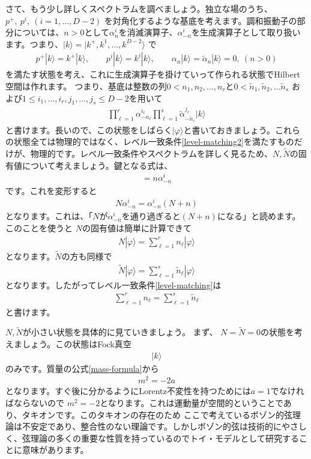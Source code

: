 \documentclass[report,paper=a4, fontsize=12pt, line_length=16cm, number_of_lines=33,dvipdfmx]{jlreq}
\numberwithin{equation}{chapter}
\numberwithin{equation}{section}
\newcommand{\alphat}{\tilde{\alpha}}
\newcommand{\Nt}{\widetilde{N}}
\begin{document}
さて、もう少し詳しくスペクトラムを調べましょう。独立な場のうち、$p^{+},\ p^{i},\ (i=1,\dots, D-2)$
を対角化するような基底を考えます。調和振動子の部分については、$n>0$として$\alpha_n^i$を消滅演算子、$\alpha_{-n}^i$を生成演算子として取り扱います。つまり、$|k\rangle=|k^+,k^1,\dots,k^{D-2}\rangle$ で
\begin{align}
p^{+}|k\rangle=k^{+}|k\rangle,\qquad
p^{i}|k\rangle=k^{i}|k\rangle,\qquad
\alpha_n|k\rangle=\alphat_n|k\rangle=0,\ (n>0)
\end{align}
を満たす状態を考え、これに生成演算子を掛けていって作られる状態でHilbert空間は作れます。
つまり、基底は整数の列$0<n_1,n_2, \dots, n_{r}$と$0<\tilde n_1, \tilde n_2, \dots \tilde n_{s}$
および$1 \le i_1,\dots,i_r,j_1,\dots,j_s\le D-2$を用いて
\begin{align}
\prod_{\ell=1}^{r}\alpha_{-n_{\ell}}^{i_{\ell}} \prod_{\ell=1}^{s}\alphat_{-\tilde n_{\ell}}^{j_{\ell}}|k\rangle
\end{align}
と書けます。長いので、この状態をしばらく$|\varphi\rangle$と書いておきましょう。これらの状態全ては物理的ではなく、レベル一致条件\eqref{level-matching2}を満たすものだけが、物理的です。レベル一致条件やスペクトラムを詳しく見るため、$N,\Nt$の固有値について考えましょう。鍵となる式は、
\begin{align}
[N,\alpha^i_{-n}]=n\alpha^i_{-n}
\end{align}
です。これを変形すると
\begin{align}
N\alpha^i_{-n}=\alpha^i_{-n}(N+n)
\end{align}
となります。これは、「$N$が$\alpha^i_{-n}$を通り過ぎると$(N+n)$になる」と読めます。このことを使うと
$N$の固有値は簡単に計算できて
\begin{align}
N|\varphi\rangle=\sum_{\ell=1}^{r}n_{\ell}|\varphi\rangle
\end{align}
となります。$\Nt$の方も同様で
\begin{align}
\Nt|\varphi\rangle=\sum_{\ell=1}^{s}\tilde n_{\ell}|\varphi\rangle
\end{align}
となります。したがってレベル一致条件\eqref{level-matching}は
\begin{align}
\sum_{\ell=1}^{r}n_{\ell}=\sum_{\ell=1}^{s}\tilde n_{\ell}
\end{align}
と書けます。

$N,\Nt$が小さい状態を具体的に見ていきましょう。
まず、 $N=\Nt=0$の状態を考えましょう。この状態はFock真空
\begin{align}
 |k\rangle
\end{align}
のみです。質量の公式\eqref{mass-formula}から
\begin{align}
m^2=-2a
\end{align}
となります。すぐ後に分かるようにLorentz不変性を持つためには$a=1$でなければならないので
$m^2=-2$となります。これは運動量が空間的ということであり、タキオンです。このタキオンの存在のため
ここで考えているボゾン的弦理論は不安定であり、整合性のない理論です。しかしボゾン的弦は技術的にやさしく、弦理論の多くの重要な性質を持っているのでトイ・モデルとして研究することに意味があります。
\end{document}
